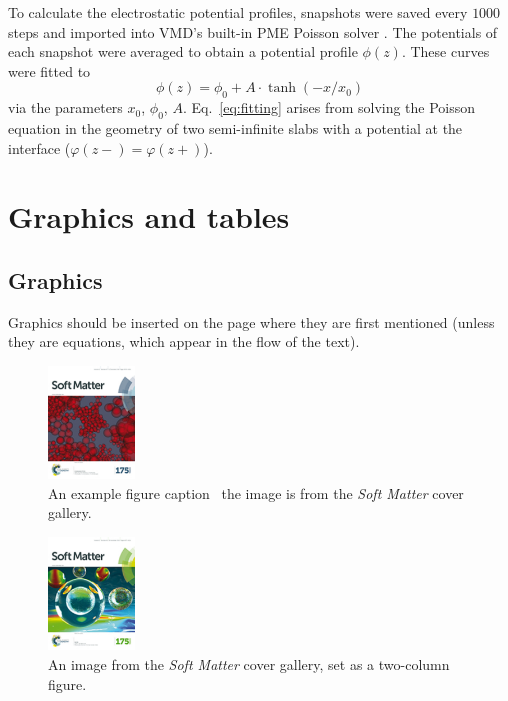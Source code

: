 \documentclass[twoside,twocolumn,9pt]{article}
\begin{document}
To calculate the electrostatic potential profiles,  snapshots were saved every $1000$ steps and imported into VMD's built-in PME Poisson solver \cite{Aksimentiev_2005}. The potentials of each snapshot were averaged to obtain a potential profile $\phi(z)$. These curves were fitted to 
\begin{equation}\label{eq:fitting}
\phi(z) =  \phi_0 + A \cdot \tanh(-x/x_0)
\end{equation}
via the parameters $x_0$, $\phi_0$, $A$. Eq.~\eqref{eq:fitting} arises from solving the Poisson equation in the geometry of two semi-infinite slabs with a potential at the interface ($\varphi(z-) = \varphi(z+)$).




\section{Graphics and tables}
\subsection{Graphics}
Graphics should be inserted on the page where they are first mentioned (unless they are equations, which appear in the flow of the text).\cite{Cotton1999}

\begin{figure}[h]
\centering
  \includegraphics[height=3cm]{example1}
  \caption{An example figure caption \textendash\ the image is from the \textit{Soft Matter} cover gallery.}
  \label{fgr:example}
\end{figure}

\begin{figure}
 \centering
 \includegraphics[height=3cm]{example2}
 \caption{An image from the \textit{Soft Matter} cover gallery, set as a two-column figure.}
 \label{fgr:example2col}
\end{figure}
\end{document}
